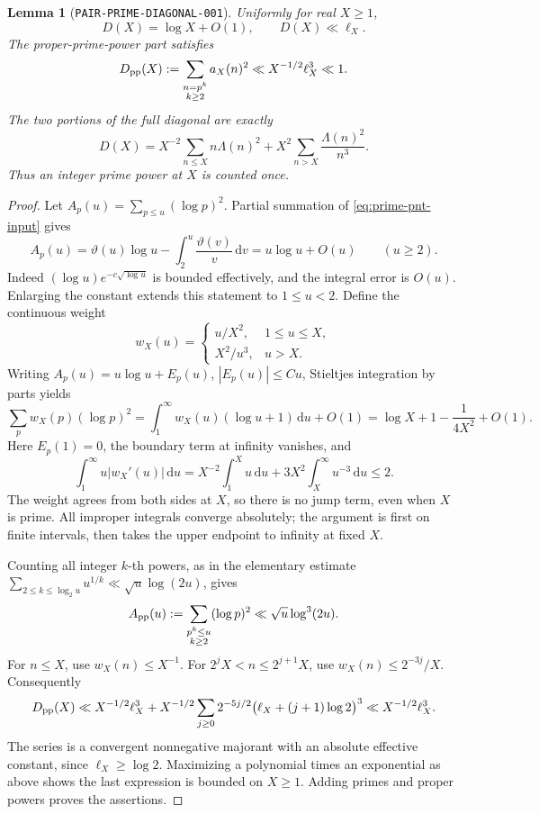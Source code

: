 \documentclass[11pt]{article}
\newtheorem{lemma}{Lemma}
\newcommand{\dd}{\,\mathrm d}
\begin{document}
\begin{lemma}[\texttt{PAIR-PRIME-DIAGONAL-001}]\label{lem:prime-diagonal}
Uniformly for real \(X\geq1\),
\begin{equation}\label{eq:prime-diagonal}
 D(X)=\log X+O(1),\qquad D(X)\ll\ell_X.
\end{equation}
The proper-prime-power part satisfies
\begin{equation}\label{eq:primepowers-diagonal}
 D_{\rm pp}(X):=\sum_{\substack{n=p^k\\k\geq2}}a_X(n)^2
 \ll X^{-1/2}\ell_X^3\ll1.
\end{equation}
The two portions of the full diagonal are exactly
\[
 D(X)=X^{-2}\sum_{n\leq X}n\Lambda(n)^2
       +X^2\sum_{n>X}\frac{\Lambda(n)^2}{n^3}.
\]
Thus an integer prime power at \(X\) is counted once.
\end{lemma}
\begin{proof}
Let \(A_p(u)=\sum_{p\leq u}(\log p)^2\). Partial summation of
\eqref{eq:prime-pnt-input} gives
\[
 A_p(u)=\vartheta(u)\log u-\int_2^u\frac{\vartheta(v)}v\dd v
       =u\log u+O(u)\qquad(u\geq2).
\]
Indeed \((\log u)e^{-c\sqrt{\log u}}\) is bounded effectively,
and the integral error is \(O(u)\). Enlarging the constant extends
this statement to \(1\leq u<2\).
Define the continuous weight
\[
 w_X(u)=
 \begin{cases}u/X^2,&1\leq u\leq X,\\ X^2/u^3,&u>X.\end{cases}
\]
Writing \(A_p(u)=u\log u+E_p(u)\), \(|E_p(u)|\leq Cu\),
Stieltjes integration by parts yields
\[
 \sum_p w_X(p)(\log p)^2
 =\int_1^\infty w_X(u)(\log u+1)\dd u+O(1)
 =\log X+1-\frac1{4X^2}+O(1).
\]
Here \(E_p(1)=0\), the boundary term at infinity vanishes, and
\[
 \int_1^\infty u|w_X'(u)|\dd u
 =X^{-2}\int_1^X u\dd u+
       3X^2\int_X^\infty u^{-3}\dd u\leq2.
\]
The weight agrees from both sides at \(X\), so there is no jump term,
even when \(X\) is prime. All improper integrals converge absolutely;
the argument is first on finite intervals, then takes the upper
endpoint to infinity at fixed \(X\).

Counting all integer \(k\)-th powers, as in the elementary estimate
\(\sum_{2\leq k\leq\log_2u}u^{1/k}\ll\sqrt u\log(2u)\), gives
\[
 A_{\rm pp}(u):=\sum_{\substack{p^k\leq u\\k\geq2}}(\log p)^2
 \ll\sqrt u\log^3(2u).
\]
For \(n\leq X\), use \(w_X(n)\leq X^{-1}\).
For \(2^jX<n\leq2^{j+1}X\), use
\(w_X(n)\leq2^{-3j}/X\). Consequently
\[
 D_{\rm pp}(X)\ll X^{-1/2}\ell_X^3+
 X^{-1/2}\sum_{j\geq0}2^{-5j/2}
             \bigl(\ell_X+(j+1)\log2\bigr)^3
 \ll X^{-1/2}\ell_X^3.
\]
The series is a convergent nonnegative majorant with an absolute
effective constant, since \(\ell_X\geq\log2\).
Maximizing a polynomial times an exponential as above shows the
last expression is bounded on \(X\geq1\).
Adding primes and proper powers proves the assertions.
\end{proof}
\end{document}
